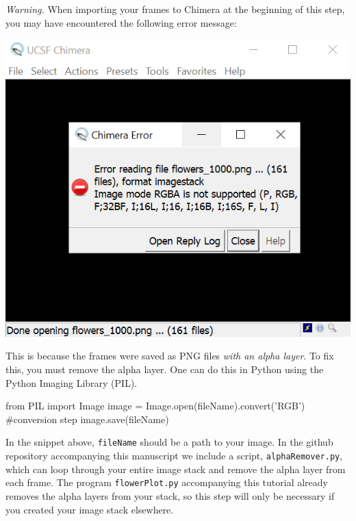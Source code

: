 \documentclass[12 pt]{article}
\begin{document}
\textit{Warning.} When importing your frames to Chimera at the beginning of this step, you may have encountered the following error message:
\begin{center}
  \includegraphics[width=.55\textwidth]{images/rgbaError.PNG}
\end{center}
This is because the frames were saved as PNG files \textit{with an alpha layer}.  To fix this, you must remove the alpha layer.  One can do this in Python using the Python Imaging Library (PIL).
\begin{python}
from PIL import Image
image = Image.open(fileName).convert('RGB') #conversion step
image.save(fileName)
\end{python}
In the snippet above, \verb|fileName| should be a path to your image.  In the github repository accompanying this manuscript \cite{github} we include a script, \verb|alphaRemover.py|, which can loop through your entire image stack and remove the alpha layer from each frame.  The program \verb|flowerPlot.py| accompanying this tutorial already removes the alpha layers from your stack, so this step will only be necessary if you created your image stack elsewhere.
\end{document}
